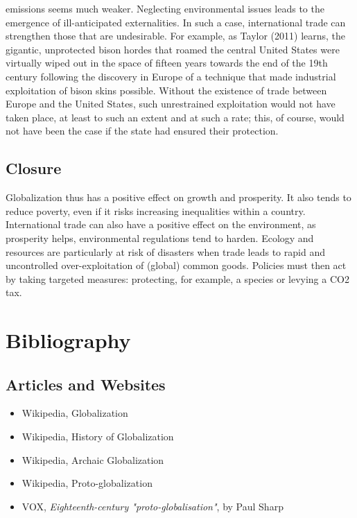 \documentclass[12pt]{article}
\begin{document}
emissions seems much weaker. Neglecting environmental issues leads to the emergence of ill-anticipated externalities. In such a case, international trade can strengthen those that are undesirable. For example, as Taylor (2011) learns, the gigantic, unprotected bison hordes that roamed the central United States were virtually wiped out in the space of fifteen years towards the end of the 19th century following the discovery in Europe of a technique that made industrial exploitation of bison skins possible. Without the existence of trade between Europe and the United States, such unrestrained exploitation would not have taken place, at least to such an extent and at such a rate; this, of course, would not have been the case if the state had ensured their protection.

\subsection{Closure}

Globalization thus has a positive effect on growth and prosperity. It also tends to reduce poverty, even if it risks increasing inequalities within a country. International trade can also have a positive effect on the environment, as prosperity helps, environmental regulations tend to harden. Ecology and resources are particularly at risk of disasters when trade leads to rapid and uncontrolled over-exploitation of (global) common goods. Policies must then act by taking targeted measures: protecting, for example, a species or levying a CO2 tax.

\section{Bibliography}

\subsection{Articles and Websites}
\begin{itemize}
    \item Wikipedia, Globalization
    \item Wikipedia, History of Globalization
    \item Wikipedia, Archaic Globalization
    \item Wikipedia, Proto-globalization
    \item VOX, \textit{Eighteenth-century "proto-globalisation"}, by Paul Sharp
\end{itemize}

\listoffigures
\end{document}
